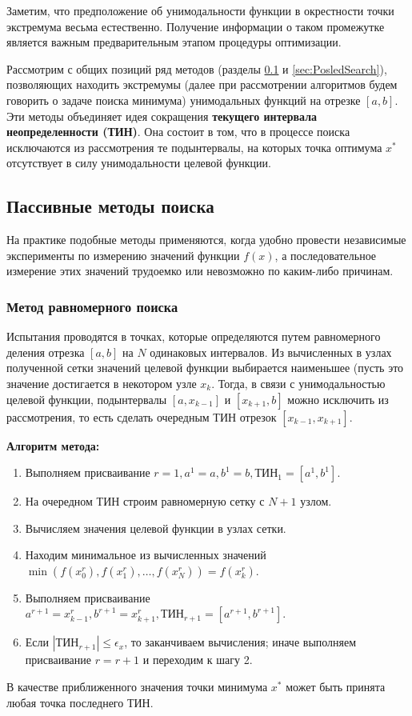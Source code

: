 \documentclass[a4paper,12pt]{report}
\begin{document}
Заметим, что предположение об унимодальности функции в окрестности точки экстремума весьма естественно. Получение информации о таком промежутке является важным предварительным этапом процедуры оптимизации.

Рассмотрим с общих позиций ряд методов (разделы \ref{sec:PassiveSearch} и \ref{sec:PosledSearch}), позволяющих находить экстремумы (далее при рассмотрении алгоритмов будем говорить о задаче поиска минимума) унимодальных функций на отрезке $\left[a, b\right]$. Эти методы объединяет идея сокращения \textbf{текущего интервала неопределенности (ТИН)}. Она состоит в том, что в процессе поиска исключаются из рассмотрения те подынтервалы, на которых точка оптимума $x^{*}$ отсутствует в силу унимодальности целевой функции.

\subsection{Пассивные методы поиска}
\label{sec:PassiveSearch}
На практике подобные методы применяются, когда удобно провести независимые эксперименты по измерению значений функции $f(x)$, а последовательное измерение этих значений трудоемко или невозможно по каким-либо причинам.

\subsubsection{Метод равномерного поиска}
Испытания проводятся в точках, которые определяются путем равномерного деления отрезка $\left[a, b\right]$ на $N$ одинаковых интервалов. Из вычисленных в узлах полученной сетки значений целевой функции выбирается наименьшее (пусть это значение достигается в некотором узле $x_{k}$. Тогда, в связи с унимодальностью целевой функции, подынтервалы $\left[a, x_{k-1}\right]$ и $\left[x_{k+1}, b\right]$ можно исключить из рассмотрения, то есть сделать очередным ТИН отрезок $\left[x_{k-1}, x_{k+1}\right]$.

\textbf{Алгоритм метода:}
\begin{enumerate}
\item Выполняем присваивание $r = 1, a^{1} = a, b^{1} = b, \text{ТИН}_{1} = \left[a^{1}, b^{1}\right]$.
\item На очередном ТИН строим равномерную сетку с $N + 1$ узлом.
\item Вычисляем значения целевой функции в узлах сетки.
\item Находим минимальное из вычисленных значений $\min(f(x^{r}_{0}), f(x^{r}_{1}), \ldots, f(x^{r}_{N})) = f(x^{r}_{k})$.
\item Выполняем присваивание $a^{r+1} = x^{r}_{k-1}, b^{r+1} = x^{r}_{k+1}, \text{ТИН}_{r+1} = \left[a^{r+1}, b^{r+1}\right]$.
\item Если $\left|\text{ТИН}_{r+1}\right| \leq \epsilon_{x}$, то заканчиваем вычисления; иначе выполняем присваивание $r = r + 1$ и переходим к шагу 2.
\end{enumerate}
В качестве приближенного значения точки минимума $x^{*}$ может быть принята любая точка последнего ТИН.
\end{document}
